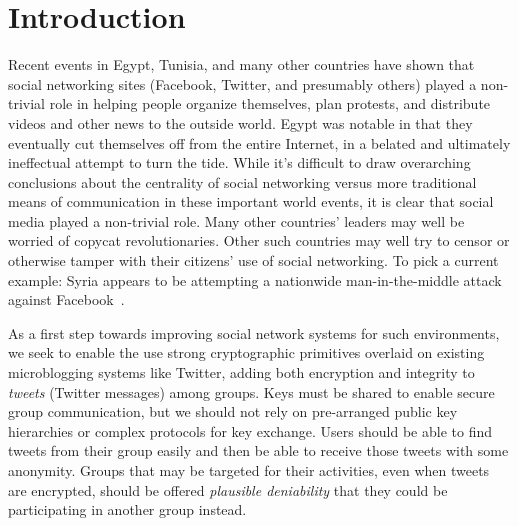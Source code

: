 \documentclass{sig-alternate-arxiv}
\newcommand{\hoot}{{\tt \#h00t}\xspace}
\begin{document}
%
\section{Introduction}

Recent events in Egypt, Tunisia, and many other countries have shown
that social networking sites (Facebook, Twitter, and presumably others)
played a non-trivial role in helping people organize themselves, plan
protests, and distribute videos and other news to the outside
world. Egypt was notable in that they eventually cut themselves off from
the entire Internet, in a belated and ultimately ineffectual attempt to
turn the tide. While it's difficult to draw overarching conclusions
about the centrality of social networking versus more traditional means
of communication in these important world events, it is clear that
social media played a non-trivial role. Many other countries' leaders
may well be worried of copycat revolutionaries. Other such countries may
well try to censor or otherwise tamper with their citizens' use of
social networking. To pick a current example: Syria appears to be
attempting a nationwide man-in-the-middle attack against
Facebook~\cite{syria-facebook}.

As a first step towards improving social network systems for such
environments, we seek to enable the use strong cryptographic primitives
overlaid on existing microblogging systems like Twitter, adding both
encryption and integrity to {\em tweets} (Twitter messages) among
groups. Keys must be shared to enable secure group communication, but we
should not rely on pre-arranged public key hierarchies or complex
protocols for key exchange. Users should be able to find tweets from
their group easily and then be able to receive those tweets with some
anonymity. Groups that may be targeted for their activities, even when
tweets are encrypted, should be offered {\em plausible deniability} that
they could be participating in another group instead.

\end{document}
